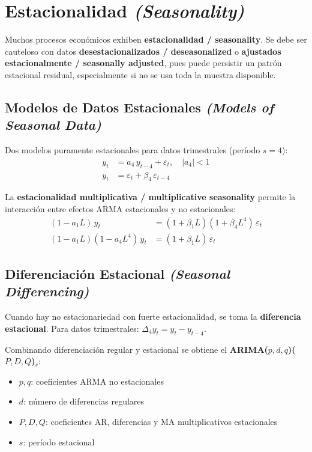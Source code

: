 \documentclass[12pt]{article}
\begin{document}
\section{Estacionalidad \textit{(Seasonality)}}

Muchos procesos econ\'omicos exhiben \textbf{estacionalidad / seasonality}. Se debe ser cauteloso con datos \textbf{desestacionalizados / deseasonalized} o \textbf{ajustados estacionalmente / seasonally adjusted}, pues puede persistir un patr\'on estacional residual, especialmente si no se usa toda la muestra disponible.

\subsection{Modelos de Datos Estacionales \textit{(Models of Seasonal Data)}}

Dos modelos puramente estacionales para datos trimestrales (per\'iodo $s = 4$):
\begin{align}
y_t &= a_4\,y_{t-4} + \varepsilon_t, \quad |a_4| < 1 \label{eq:sAR}\\
y_t &= \varepsilon_t + \beta_4\,\varepsilon_{t-4} \label{eq:sMA}
\end{align}

La \textbf{estacionalidad multiplicativa / multiplicative seasonality} permite la interacci\'on entre efectos ARMA estacionales y no estacionales:
\begin{align}
(1 - a_1 L)\,y_t &= (1 + \beta_1 L)(1 + \beta_4 L^4)\,\varepsilon_t \label{eq:multSMA}\\
(1 - a_1 L)(1 - a_4 L^4)\,y_t &= (1 + \beta_1 L)\,\varepsilon_t \label{eq:multSAR}
\end{align}

\subsection{Diferenciaci\'on Estacional \textit{(Seasonal Differencing)}}

Cuando hay no estacionariedad con fuerte estacionalidad, se toma la \textbf{diferencia estacional}. Para datos trimestrales: $\Delta_4 y_t = y_t - y_{t-4}$.

Combinando diferenciaci\'on regular y estacional se obtiene el \textbf{ARIMA($p,d,q$)($P,D,Q$)$_s$}:
\begin{itemize}
  \item $p, q$: coeficientes ARMA no estacionales
  \item $d$: n\'umero de diferencias regulares
  \item $P, D, Q$: coeficientes AR, diferencias y MA multiplicativos estacionales
  \item $s$: per\'iodo estacional
\end{itemize}
\end{document}
